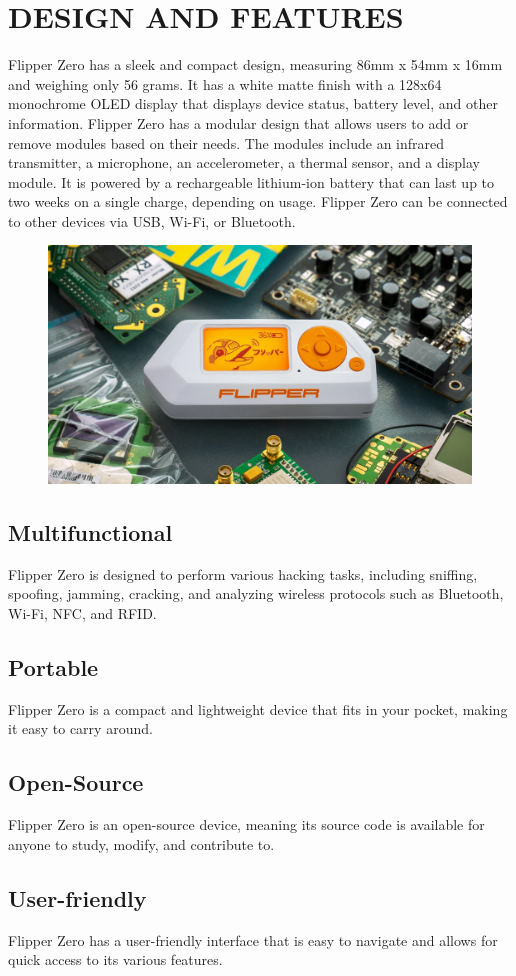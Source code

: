 \documentclass[a4paper,11pt]{report}
\begin{document}
\chapter{DESIGN AND FEATURES}
Flipper Zero has a sleek and compact design, measuring 86mm x 54mm x 16mm and weighing only 56 grams. It has a white matte finish with a 128x64 monochrome OLED display that displays device status, battery level, and other information. Flipper Zero has a modular design that allows users to add or remove modules based on their needs. The modules include an infrared transmitter, a microphone, an accelerometer, a thermal sensor, and a display module. It is powered by a rechargeable lithium-ion battery that can last up to two weeks on a single charge, depending on usage. Flipper Zero can be connected to other devices via USB, Wi-Fi, or Bluetooth.
\begin{figure}[h]
	\centering
	\hspace{21pt}
	\includegraphics[width=.70\linewidth]{flipper-zero.png}
	\label{fig:type.png}
\end{figure}
\section{Multifunctional}
Flipper Zero is designed to perform various hacking tasks, including sniffing, spoofing, jamming, cracking, and analyzing wireless protocols such as Bluetooth, Wi-Fi, NFC, and RFID.
\section{Portable}
Flipper Zero is a compact and lightweight device that fits in your pocket, making it easy to carry around.
\section{Open-Source}
Flipper Zero is an open-source device, meaning its source code is available for anyone to study, modify, and contribute to.
\section{User-friendly}
Flipper Zero has a user-friendly interface that is easy to navigate and allows for quick access to its various features.
\end{document}
